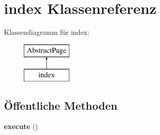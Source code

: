 \hypertarget{classindex}{}\section{index Klassenreferenz}
\label{classindex}
Klassendiagramm für index\+:\begin{figure}[H]
\begin{center}
\leavevmode
\includegraphics[height=2.000000cm]{classindex}
\end{center}
\end{figure}
\subsection*{Öffentliche Methoden}
\begin{DoxyCompactItemize}
\item 
\mbox{\label{classindex_a725649cf882ae1c86275ddf8af6cca85}} 
{\bfseries execute} ()
\end{DoxyCompactItemize}
